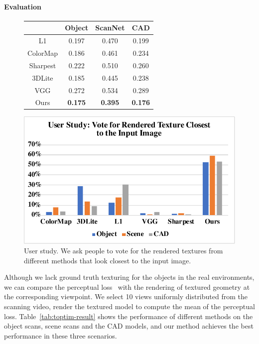 \paragraph*{Evaluation}
\begin{figure}
\begin{minipage}{0.49\linewidth}
    \centering
    \begin{tabular}{|c|c|c|c|}
        \hline
        & Object & ScanNet & CAD\\
        \hline
        L1 & 0.197 & 0.470 & 0.199 \\
        \hline
        ColorMap & 0.186 & 0.461 & 0.234 \\
        \hline
        Sharpest & 0.222 & 0.510 & 0.260 \\
        \hline
        3DLite & 0.185 & 0.445 & 0.238 \\
        \hline
        VGG & 0.272 & 0.534 & 0.289 \\
        \hline
        Ours & \textbf{0.175} & \textbf{0.395} & \textbf{0.176} \\
        \hline
    \end{tabular}
    \label{tab:toptim-result}
\end{minipage}
\begin{minipage}{0.49\linewidth}
    \centering
    \includegraphics[width=0.8\linewidth]{texturegen/figures/user.pdf}
    \caption{User study. We ask people to vote for the rendered textures from different methods that look closest to the input image.}
    \label{fig:user-study}
\end{minipage}
\end{figure}
Although we lack ground truth texturing for the objects in the real environments, we can compare the perceptual loss~\cite{zhang2018unreasonable} with the rendering of textured geometry at the corresponding viewpoint. We select 10 views uniformly distributed from the scanning video, render the textured model to compute the mean of the perceptual loss.
Table~\ref{tab:toptim-result} shows the performance of different methods on the object scans, scene scans and the CAD models, and our method achieves the best performance in these three scenarios.

